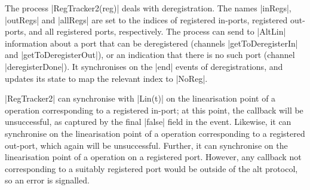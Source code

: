 

The process |RegTracker2(reg)| deals with deregistration.  The names |inRegs|,
|outRegs| and |allRegs| are set to the indices of registered in-ports,
registered out-ports, and all registered ports, respectively.  The process can
send to |AltLin| information about a port that can be deregistered (channels
|getToDeregisterIn| and |getToDeregisterOut|), or an indication that there is
no such port (channel |deregisterDone|).  It synchronises on the |end| events
of deregistrations, and updates its state to map the relevant index to
|NoReg|.

|RegTracker2| can synchronise with |Lin(t)| on the linearisation point of a
 operation corresponding to a registered in-port; at this
point, the callback will be unsuccessful, as captured by the final |false|
field in the event.  Likewise, it can synchronise on the linearisation point
of a  operation corresponding to a registered out-port, which
again will be unsuccessful.  Further, it can synchronise on the linearisation
point of a  operation on a registered port.  However, any
callback not corresponding to a suitably registered port would be outside of
the alt protocol, so an error is signalled. 



